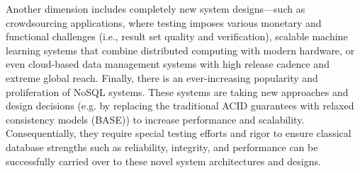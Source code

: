 \documentclass[sigconf]{acmart}
\begin{document}
Another dimension includes completely new system designs---such as crowdsourcing applications, where testing imposes various monetary and functional challenges (i.e., result set quality and verification), scalable machine learning systems that combine distributed computing with modern hardware, or even cloud-based data management systems with high release cadence and extreme global reach.
Finally, there is an ever-increasing popularity and proliferation of NoSQL systems.
These systems are taking new approaches and design decisions (e.g. by replacing the traditional ACID guarantees with relaxed consistency models (BASE)) to increase performance and scalability.
Consequentially, they require special testing efforts and rigor to ensure classical database strengths such as reliability, integrity, and performance can be successfully carried over to these novel system architectures and designs.
\end{document}
